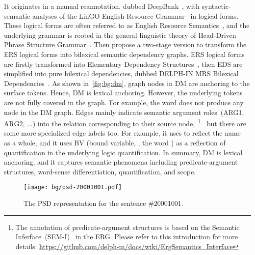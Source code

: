 It originates in a manual reannotation, dubbed
DeepBank~\citep{Fli:Kor:Zha:12}, with syntactic-semantic analyses of
the LinGO English Resource Grammar~\citep{Oep:Fli:Tou:04} in logical
forms. These logical forms are often referred to as English Resource
Semantics~\citep[ERS,][]{Ben:Fli:Oep:15}, and the underlying grammar
is rooted in the general linguistic theory of Head-Driven Phrase
Structure Grammar~\citep[HPSG,][]{Pol:Sag:94}. Then
\citet{Iva:Oep:Ovr:12} propose a two-stage version to transform the
ERS logical forms into bilexical semantic dependency graphs. ERS
logical forms are firstly transformed into Elementary Dependency
Structures~\citep[EDS,][]{Oep:Lon:06}, then EDS are simplified into
pure bilexical dependencies, dubbed DELPH-IN MRS Bilexical
Dependencies~\citep[DM,][]{Iva:Oep:Ovr:12}. As shown
in~\autoref{fig:bg:dm}, graph nodes in DM are anchoring to the surface
tokens. Hence, DM is lexical anchoring. However, the underlying tokens
are not fully covered in the graph. For example, the word
 does not produce any node in the DM graph. Edges mainly
indicate semantic argument roles~(ARG1, ARG2, ...) into the relation
corresponding to their source node,~\footnote{The annotation of
  predicate-argument structures is based on the Semantic
  Inferface~(SEM-I)~\citep{Fli:Lon:Dyv:05} in the ERG. Please refer to this introduction for
  more
  details. \url{https://github.com/delph-in/docs/wiki/ErgSemantics_Interface}}~
but there are some more specialized edge labels too. For example, it
uses  to reflect the name~ as a
whole, and it uses BV (bound variable, \eg, the word ) as
a reflection of quantification in the underlying logic
quantification. In summary, DM is lexical anchoring, and it captures
semantic phenomena including predicate-argument structures, word-sense
differentiation, quantification, and scope.

\begin{figure}[!tbp]
\begin{center}
\texttt{[image: bg/psd-20001001.pdf]}
\end{center}
\caption{\label{fig:bg:psd}The PSD representation for the sentence
  \#20001001.}
\end{figure}

